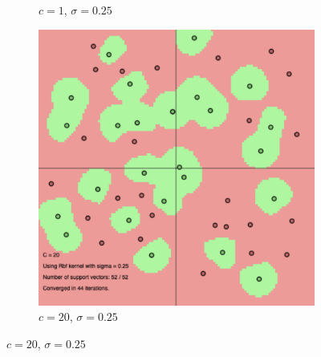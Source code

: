 \documentclass[a4paper, 11pt, one column]{article}
\begin{document}
\begin{figure}
\begin{subfigure}{0.3\textwidth}
   \caption{$c=1$, $\sigma=0.25$} \label{fig:x_b}
\end{subfigure}
\hspace*{\fill}
\begin{subfigure}{0.3\textwidth}
   \includegraphics[width=\linewidth]{images/rbf_c_20_s_0.25.png}
   \caption{$c=20$, $\sigma=0.25$} \label{fig:x_c}
\end{subfigure}


\end{figure}
\end{document}
